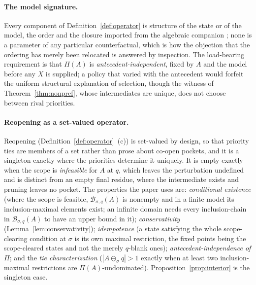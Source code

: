 \paragraph{The model signature.} Every component of Definition~\ref{def:operator} is structure of the state or of the model, the order and the closure imported from the algebraic companion \parencite{AethusTree}; none is a parameter of any particular counterfactual, which is how the objection that the ordering has merely been relocated is answered by inspection. The load-bearing requirement is that $\Pi(A)$ is \emph{antecedent-independent}, fixed by $A$ and the model before any $X$ is supplied; a policy that varied with the antecedent would forfeit the uniform structural explanation of selection, though the witness of Theorem~\ref{thm:nonpref}, whose intermediates are unique, does not choose between rival priorities.

\paragraph{Reopening as a set-valued operator.} Reopening (Definition~\ref{def:operator}~(c)) is set-valued by design, so that priority ties are members of a set rather than prose about co-open pockets, and it is a singleton exactly where the priorities determine it uniquely. It is empty exactly when the scope is \emph{infeasible} for $A$ at $q$, which leaves the perturbation undefined and is distinct from an empty final residue, where the intermediate exists and pruning leaves no pocket. The properties the paper uses are: \emph{conditional existence} (where the scope is feasible, $\mathcal{B}_{\sigma,q}(A)$ is nonempty and in a finite model its inclusion-maximal elements exist; an infinite domain needs every inclusion-chain in $\mathcal{B}_{\sigma,q}(A)$ to have an upper bound in it); \emph{conservativity} (Lemma~\ref{lem:conservativity}); \emph{idempotence} (a state satisfying the whole scope-clearing condition at $\sigma$ is its own maximal restriction, the fixed points being the scope-cleared states and not the merely $q$-blank ones); \emph{antecedent-independence of $\Pi$}; and the \emph{tie characterization} ($|A \ominus_{\sigma} q| > 1$ exactly when at least two inclusion-maximal restrictions are $\Pi(A)$-undominated). Proposition~\ref{prop:interior} is the singleton case.

